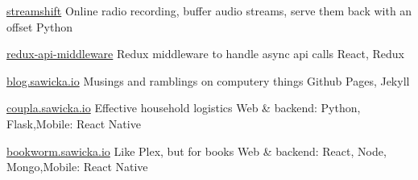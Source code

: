 
\begin{cvprojects}

	\cvproject
		{\faGithub\acvHeaderIconSep \href{https://github.com/goshasawicka/streamshift}{streamshift}}
		{Online radio recording, buffer audio streams, serve them back with an offset}
		{Python}

	\cvproject
		{\faGithub\acvHeaderIconSep \href{https://github.com/goshasawicka/redux-api-middleware}{redux-api-middleware}}
		{Redux middleware to handle async api calls}
		{React, Redux}

	\cvproject
		{\faGithub\acvHeaderIconSep \href{http://blog.sawicka.io}{blog.sawicka.io}}
		{Musings and ramblings on computery things}
		{Github Pages, Jekyll}

	\cvproject
		{\href{http://coupla.sawicka.io}{coupla.sawicka.io}}
		{Effective household logistics}
		{Web \& backend: Python, Flask,\newline Mobile: React Native}

	\cvproject
		{\href{http://bookworm.sawicka.io}{bookworm.sawicka.io}}
		{Like Plex, but for books}
		{Web \& backend: React, Node, Mongo,\newline Mobile: React Native}

\end{cvprojects}

